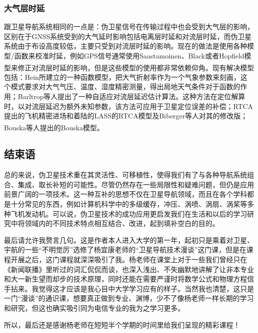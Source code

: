 \documentclass[12pt, a4paper, oneside]{ctexart}
\newcommand{\upcite}[1]{\textsuperscript{\cite{#1}}}
\begin{document}
\subsubsection{大气层时延}

跟卫星导航系统相同的一点是：伪卫星信号在传输过程中也会受到大气层的影响，区别在于GNSS系统受到的大气延时影响包括电离层时延和对流层时延，而伪卫星系统由于布设高度较低，主要只受到对流层时延的影响。现在的做法是使用各种模型/函数来校准时延，例如GPS信号通常使用Saastamoinen、Black或者Hopfield模型来修正对流层时延的影响，但是这些模型的使用都非常依赖仰角。\upcite{001,05}现有解决模型包括：Hein所建立的一种函数模型，把大气折射率作为一个气象参数来刻画，这个模式要求对大气气压、温度、湿度精密测量，得出局地天气条件对于函数的作用；Barltrop等人提出了一种自适应对流层延迟估计算法。这种方法在定位解算时，以对流层延迟为额外未知参数，该方法可应用于卫星定位误差的补偿；RTCA提出的飞机精密进场和着陆的LASS的RTCA模型及Biberger等人对其的修改版；Bouska等人提出的Bouska模型。\upcite{002}

\subsection{结束语}

总的来说，伪卫星技术重在其灵活性、可移植性，使得我们有了与各种导航系统组合、集成、取长补短的可能性。尽管仍然存在一些局限性和疑难问题，但仍是应用前景广阔的一项技术。这一种互补的思想不仅在卫星导航领域，而且在各个学科都是十分常见的东西，例如计算机科学中的多级缓存，冲压、涡喷、涡扇、涡桨等多种飞机发动机。可以说，伪卫星技术的成功应用更启发我们在生活和以后的学习研究中将领域内的不同技术特点相互结合、改进，起到填补空白的目的。

最后请允许我赘言几句。这是作者本人进入大学的第一年，起初只是乘着对卫星、宇航的一些“不明觉厉”选修了杨宜康老师的“卫星导航技术漫谈”这门课，但是在课程开展之后，这门课程就深深吸引了我。杨老师在课堂上对于一些我们曾经只在《新闻联播》里听过的词汇侃侃而谈，也深入浅出、不失幽默地讲解了让非本专业和大一新生望而却步的技术原理，同时还能在需要严谨时将数学公式和物理方程信手拈来。我觉得这才应该是我心目中大学学习应有的样子。当然我也清楚，这只是一门“漫谈”的通识课，想要真正做到专业、渊博，少不了像杨老师一样长期的学习和研究，但这也确实吸引同为电信专业的我为之学习更多。

所以，最后还是感谢杨老师在短短半个学期的时间里给我们呈现的精彩课程！





\end{document}
